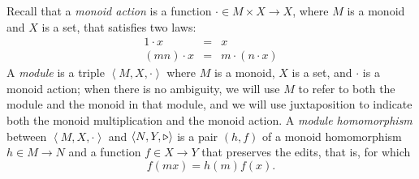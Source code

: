 \begin{defn}[$R$-similarity]
\begin{theorem}
\begin{lemma}
\begin{theorem}[No products]
\begin{lemma}
\begin{defn}
\begin{theorem}
\begin{corollary}[Hylomorphism]
\begin{defn}
\begin{defn}[Symmetrization]
\begin{theorem}
Recall that a \emph{monoid action} is a function $\cdot \in M \times X \to
X$, where $M$ is a monoid and $X$ is a set, that satisfies two laws:
\begin{eqnarray*}
            1 \cdot x &=& x \\
            (mn)\cdot x &=& m\cdot(n\cdot x)
\end{eqnarray*}
%
A \emph{module} is a triple $\left<M,X,\cdot\right>$ where $M$ is a monoid,
$X$ is a set, and $\cdot$ is a monoid action; when there is no ambiguity, we
will use $M$ to refer to both the module and the monoid in that module, and
we will use juxtaposition to indicate both the monoid multiplication and the
monoid action.
%        
A \emph{module homomorphism} between $\left<M,X,\cdot\right>$ and
$\left<N,Y,\triangleright\right>$ is a pair $(h,f)$ of a monoid homomorphism $h \in M
\to N$ and a function $f \in X \to Y$ that preserves the edits, that is, for 
which 
\[f(mx) = h(m)f(x).\]


\end{theorem}
\end{defn}
\end{defn}
\end{corollary}
\end{theorem}
\end{defn}
\end{lemma}
\end{theorem}
\end{lemma}
\end{theorem}
\end{defn}
